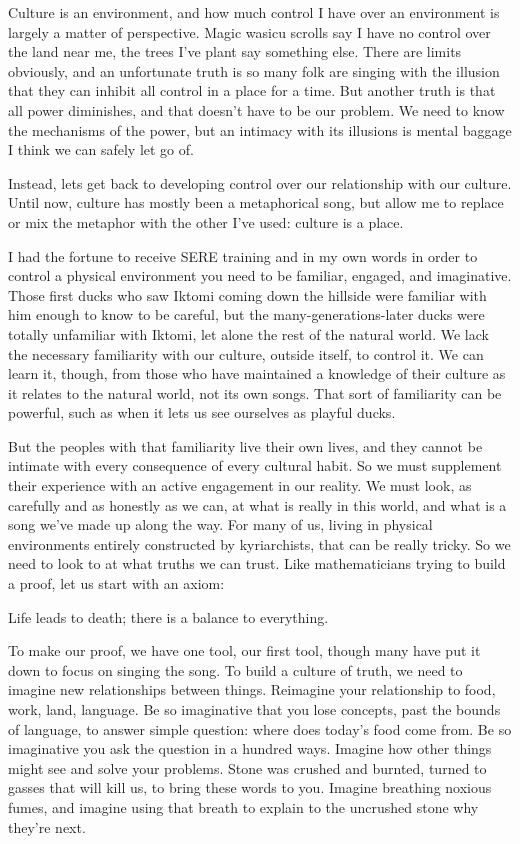 \documentclass[11pt]{article}
\begin{document}
\begin{itemize}
\begin{itemize}
Culture is an environment, and how much control I have over an environment is largely a matter of perspective. Magic wasicu scrolls say I have no control over the land near me, the trees I’ve plant say something else. There are limits obviously, and an unfortunate truth is so many folk are singing with the illusion that they can inhibit all control in a place for a time. But another truth is that all power diminishes, and that doesn’t have to be our problem. We need to know the mechanisms of the power, but an intimacy with its illusions is mental baggage I think we can safely let go of.

Instead, lets get back to developing control over our relationship with our culture. Until now, culture has mostly been a metaphorical song, but allow me to replace or mix the metaphor with the other I’ve used: culture is a place.

I had the fortune to receive SERE training and in my own words in order to control a physical environment you need to be familiar, engaged, and imaginative. Those first ducks who saw Iktomi coming down the hillside were familiar with him enough to know to be careful, but the many-generations-later ducks were totally unfamiliar with Iktomi, let alone the rest of the natural world. We lack the necessary familiarity with our culture, outside itself, to control it. We can learn it, though, from those who have maintained a knowledge of their culture as it relates to the natural world, not its own songs. That sort of familiarity can be powerful, such as when it lets us see ourselves as playful ducks.

But the peoples with that familiarity live their own lives, and they cannot be intimate with every consequence of every cultural habit. So we must supplement their experience with an active engagement in our reality. We must look, as carefully and as honestly as we can, at what is really in this world, and what is a song we’ve made up along the way. For many of us, living in physical environments entirely constructed by kyriarchists, that can be really tricky. So we need to look to at what truths we can trust. Like mathematicians trying to build a proof, let us start with an axiom:

Life leads to death; there is a balance to everything.

To make our proof, we have one tool, our first tool, though many have put it down to focus on singing the song. To build a culture of truth, we need to imagine new relationships between things. Reimagine your relationship to food, work, land, language. Be so imaginative that you lose concepts, past the bounds of language, to answer simple question: where does today’s food come from. Be so imaginative you ask the question in a hundred ways. Imagine how other things might see and solve your problems. Stone was crushed and burnted, turned to gasses that will kill us, to bring these words to you. Imagine breathing noxious fumes, and imagine using that breath to explain to the uncrushed stone why they’re next.


\end{itemize}
\end{itemize}
\end{document}
